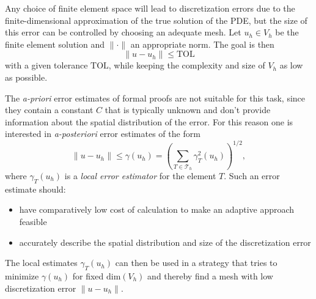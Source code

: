 \documentclass[a4paper,12pt]{article}
\begin{document}
Any choice of finite element space will lead to discretization errors due to the
finite-dimensional approximation of the true solution of the PDE, but the size of this
error can be controlled by choosing an adequate mesh. Let $u_h \in V_h$ be the finite
element solution and $\|\cdot\|$ an appropriate norm. The goal is then
\begin{equation*}
  \|u - u_h\| \leq \text{TOL}
\end{equation*}
with a given tolerance $\text{TOL}$, while keeping the complexity and size of $V_h$ as low as
possible.

The \emph{a-priori} error estimates of formal proofs are not suitable for this task, since they contain
a constant $C$ that is typically unknown and don't provide information about the spatial
distribution of the error. For this reason one is interested in \emph{a-posteriori} error
estimates of the form
\begin{equation}
  \|u - u_h\| \leq \gamma(u_h) = \left( \sum_{T \in {\mathcal T}_h} \gamma_T^2(u_h) \right)^{1/2},
\end{equation}
where $\gamma_T(u_h)$ is a \emph{local error estimator} for the element $T$. Such an error estimate
should:
\begin{itemize}
  \item have comparatively low cost of calculation to make an adaptive approach feasible
  \item accurately describe the spatial distribution and size of the discretization error
\end{itemize}
The local estimates $\gamma_T(u_h)$ can then be used in a strategy that tries to minimize $\gamma(u_h)$
for fixed $\text{dim}(V_h)$ and thereby find a mesh with low discretization error $\|u - u_h\|$.
\end{document}
